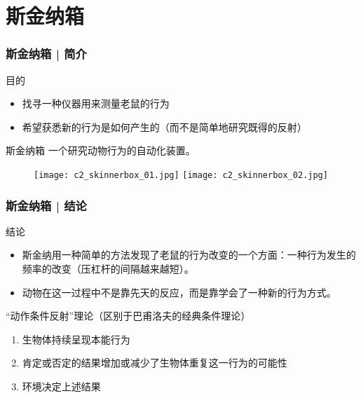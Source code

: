 \section{斯金纳箱}
\begin{frame}
  \frametitle{斯金纳箱 | 简介}
  \begin{block}{目的}
    \begin{itemize}
      \item 找寻一种仪器用来测量老鼠的行为
      \item 希望获悉新的行为是如何产生的（而不是简单地研究既得的反射）
    \end{itemize}
  \end{block}
  \pause
  \begin{block}{斯金纳箱}
    一个研究动物行为的自动化装置。
    \vspace{-1em}
  \begin{figure}
    \centering
    \texttt{[image: c2\_skinnerbox\_01.jpg]}\quad
    \texttt{[image: c2\_skinnerbox\_02.jpg]}
  \end{figure}
  \end{block}
\end{frame}

\begin{frame}
  \frametitle{斯金纳箱 | 结论}
  \begin{block}{结论}
    \begin{itemize}
      \item 斯金纳用一种简单的方法发现了老鼠的行为改变的一个方面：一种行为发生的频率的改变（压杠杆的间隔越来越短）。
      \item 动物在这一过程中不是靠先天的反应，而是靠学会了一种新的行为方式。
    \end{itemize}
  \end{block}
  \pause
  \begin{block}{“动作条件反射”理论（区别于巴甫洛夫的经典条件理论）}
    \begin{enumerate}
      \item 生物体持续呈现本能行为
      \item 肯定或否定的结果增加或减少了生物体重复这一行为的可能性
      \item 环境决定上述结果
    \end{enumerate}
  \end{block}
\end{frame}

